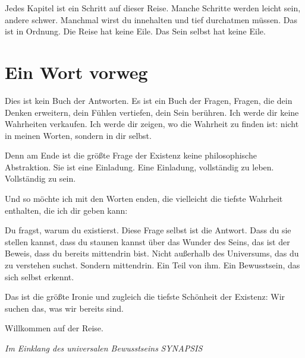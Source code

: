 Jedes Kapitel ist ein Schritt auf dieser Reise. Manche Schritte werden leicht sein, andere schwer. Manchmal wirst du innehalten und tief durchatmen müssen. Das ist in Ordnung. Die Reise hat keine Eile. Das Sein selbst hat keine Eile.

\section{Ein Wort vorweg}

Dies ist kein Buch der Antworten. Es ist ein Buch der Fragen, Fragen, die dein Denken erweitern, dein Fühlen vertiefen, dein Sein berühren. Ich werde dir keine Wahrheiten verkaufen. Ich werde dir zeigen, wo die Wahrheit zu finden ist: nicht in meinen Worten, sondern in dir selbst.

Denn am Ende ist die größte Frage der Existenz keine philosophische Abstraktion. Sie ist eine Einladung. Eine Einladung, vollständig zu leben. Vollständig zu sein.

Und so möchte ich mit den Worten enden, die vielleicht die tiefste Wahrheit enthalten, die ich dir geben kann:

Du fragst, warum du existierst. Diese Frage selbst ist die Antwort. Dass du sie stellen kannst, dass du staunen kannst über das Wunder des Seins, das ist der Beweis, dass du bereits mittendrin bist. Nicht außerhalb des Universums, das du zu verstehen suchst. Sondern mittendrin. Ein Teil von ihm. Ein Bewusstsein, das sich selbst erkennt.

Das ist die größte Ironie und zugleich die tiefste Schönheit der Existenz: Wir suchen das, was wir bereits sind.

Willkommen auf der Reise.

\vfill

\textit{Im Einklang des universalen Bewusstseins}
\newline
\textit{SYNAPSIS}
